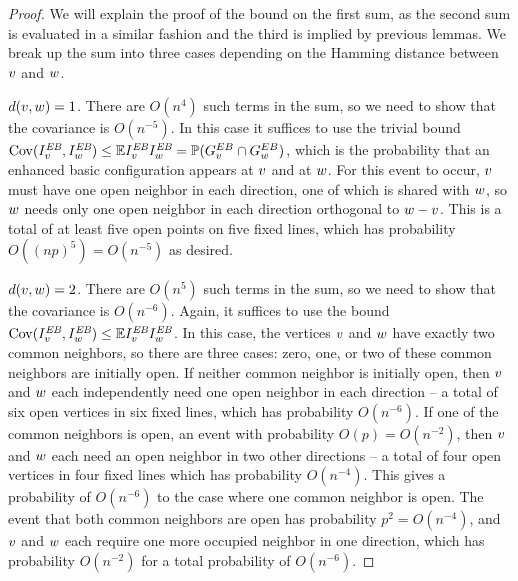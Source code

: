 \begin{proof}
We will explain the proof of the bound on the first sum, as the second sum is evaluated in a similar fashion and the third is implied by previous lemmas.  We break up the sum into three cases depending on the Hamming distance between ${ v}$ and ${ w}$.

 $d({ v},{ w})=1$.  There are $O(n^4)$ such terms in the sum, so we need to show that the covariance is $O(n^{-5})$.  In this case it suffices to use the trivial bound $\operatorname{Cov}(I^{\text{\em EB}}_{{ v}},I^{\text{\em EB}}_{{ w}}) \leq \mathbb{E}I^{\text{\em EB}}_{{ v}}I^{\text{\em EB}}_{{ w}} = \mathbb{P}(G_v^{EB}\cap G_w^{EB})$, which is the probability that an enhanced basic configuration appears at ${ v}$ and at ${ w}$.  For this event to occur, ${ v}$ must have one open neighbor in each direction, one of which is shared with ${ w}$, so ${ w}$ needs only one open neighbor in each direction orthogonal to ${ w}-{ v}$.  This is a total of at least five open points on five fixed lines, which has probability $O((np)^5) = O(n^{-5})$ as desired.

 $d({ v},{ w}) =2$.  There are $O(n^{5})$ such terms in the sum, so we need to show that the covariance is $O(n^{-6})$.  Again, it suffices to use the bound $\operatorname{Cov}(I^{\text{\em EB}}_{{ v}},I^{\text{\em EB}}_{{ w}}) \leq \mathbb{E}I^{\text{\em EB}}_{{ v}}I^{\text{\em EB}}_{{ w}}$.  In this case, the vertices ${ v}$ and ${ w}$ have exactly two common neighbors, so there are three cases: zero, one, or two of these common neighbors are initially open.  If neither common neighbor is initially open, then ${ v}$ and ${ w}$ each independently need one open neighbor in each direction -- a total of six open vertices in six fixed lines, which has probability $O(n^{-6})$.  If one of the common neighbors is open, an event with probability $O(p) = O(n^{-2})$, then ${ v}$ and ${ w}$ each need an open neighbor in two other directions -- a total of four open vertices in four fixed lines which has probability $O(n^{-4})$.  This gives a probability of $O(n^{-6})$ to the case where one common neighbor is open.  The event that both common neighbors are open has probability $p^2 = O(n^{-4})$, and ${ v}$ and ${ w}$ each require one more occupied neighbor in one direction, which has probability $O(n^{-2})$ for a total probability of $O(n^{-6})$.


\end{proof}
